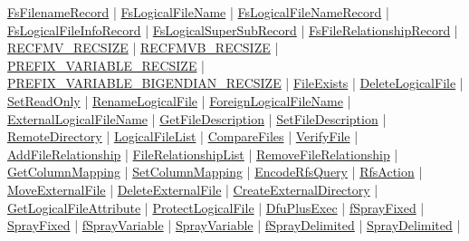 \hyperlink{ecldoc:file.fsfilenamerecord}{FsFilenameRecord}  |
\hyperlink{ecldoc:file.fslogicalfilename}{FsLogicalFileName}  |
\hyperlink{ecldoc:file.fslogicalfilenamerecord}{FsLogicalFileNameRecord}  |
\hyperlink{ecldoc:file.fslogicalfileinforecord}{FsLogicalFileInfoRecord}  |
\hyperlink{ecldoc:file.fslogicalsupersubrecord}{FsLogicalSuperSubRecord}  |
\hyperlink{ecldoc:file.fsfilerelationshiprecord}{FsFileRelationshipRecord}  |
\hyperlink{ecldoc:file.recfmv_recsize}{RECFMV\_RECSIZE}  |
\hyperlink{ecldoc:file.recfmvb_recsize}{RECFMVB\_RECSIZE}  |
\hyperlink{ecldoc:file.prefix_variable_recsize}{PREFIX\_VARIABLE\_RECSIZE}  |
\hyperlink{ecldoc:file.prefix_variable_bigendian_recsize}{PREFIX\_VARIABLE\_BIGENDIAN\_RECSIZE}  |
\hyperlink{ecldoc:file.fileexists}{FileExists}  |
\hyperlink{ecldoc:file.deletelogicalfile}{DeleteLogicalFile}  |
\hyperlink{ecldoc:file.setreadonly}{SetReadOnly}  |
\hyperlink{ecldoc:file.renamelogicalfile}{RenameLogicalFile}  |
\hyperlink{ecldoc:file.foreignlogicalfilename}{ForeignLogicalFileName}  |
\hyperlink{ecldoc:file.externallogicalfilename}{ExternalLogicalFileName}  |
\hyperlink{ecldoc:file.getfiledescription}{GetFileDescription}  |
\hyperlink{ecldoc:file.setfiledescription}{SetFileDescription}  |
\hyperlink{ecldoc:file.remotedirectory}{RemoteDirectory}  |
\hyperlink{ecldoc:file.logicalfilelist}{LogicalFileList}  |
\hyperlink{ecldoc:file.comparefiles}{CompareFiles}  |
\hyperlink{ecldoc:file.verifyfile}{VerifyFile}  |
\hyperlink{ecldoc:file.addfilerelationship}{AddFileRelationship}  |
\hyperlink{ecldoc:file.filerelationshiplist}{FileRelationshipList}  |
\hyperlink{ecldoc:file.removefilerelationship}{RemoveFileRelationship}  |
\hyperlink{ecldoc:file.getcolumnmapping}{GetColumnMapping}  |
\hyperlink{ecldoc:file.setcolumnmapping}{SetColumnMapping}  |
\hyperlink{ecldoc:file.encoderfsquery}{EncodeRfsQuery}  |
\hyperlink{ecldoc:file.rfsaction}{RfsAction}  |
\hyperlink{ecldoc:file.moveexternalfile}{MoveExternalFile}  |
\hyperlink{ecldoc:file.deleteexternalfile}{DeleteExternalFile}  |
\hyperlink{ecldoc:file.createexternaldirectory}{CreateExternalDirectory}  |
\hyperlink{ecldoc:file.getlogicalfileattribute}{GetLogicalFileAttribute}  |
\hyperlink{ecldoc:file.protectlogicalfile}{ProtectLogicalFile}  |
\hyperlink{ecldoc:file.dfuplusexec}{DfuPlusExec}  |
\hyperlink{ecldoc:file.fsprayfixed}{fSprayFixed}  |
\hyperlink{ecldoc:file.sprayfixed}{SprayFixed}  |
\hyperlink{ecldoc:file.fsprayvariable}{fSprayVariable}  |
\hyperlink{ecldoc:file.sprayvariable}{SprayVariable}  |
\hyperlink{ecldoc:file.fspraydelimited}{fSprayDelimited}  |
\hyperlink{ecldoc:file.spraydelimited}{SprayDelimited}  |
